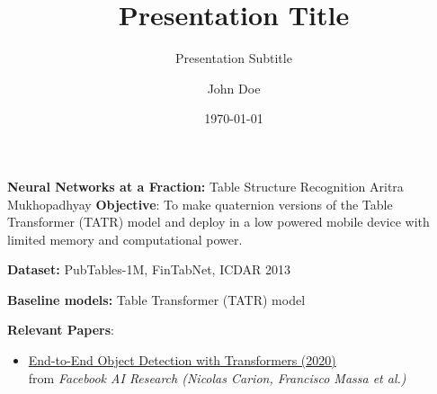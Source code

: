 \documentclass[
11pt,notheorems,hyperref={pdfauthor=Aritra Mukhopadhyay}
]{beamer}
\title[
Project proposal
]{Presentation Title}
\subtitle{Presentation Subtitle}
\author[
Aritra Mukhopadhyay
]{
    John Doe 
}
\institute{
    Author Affiliation, \\
    University of Author}
\date{\today}
\begin{document}
{
}
\addtocounter{framenumber}{-1}



\begin{frame}{\textbf{Neural Networks at a Fraction:} Table Structure Recognition
}{Aritra Mukhopadhyay}
\alert{\textbf{Objective}}: To make quaternion versions of the Table Transformer (TATR) model and deploy in a low powered mobile device with limited memory and computational power.

\alert{\textbf{Dataset:}} PubTables-1M, FinTabNet, ICDAR 2013

\alert{\textbf{Baseline models:}} Table Transformer (TATR) model






\alert{\textbf{Relevant Papers}}:
\begin{itemize}
    \item \href{https://scontent-ccu1-1.xx.fbcdn.net/v/t39.2365-6/154305880_816694605586461_2873294970659239190_n.pdf?_nc_cat=108&ccb=1-7&_nc_sid=3c67a6&_nc_ohc=DkHwrRBBc_cAX-eMpS7&_nc_ht=scontent-ccu1-1.xx&oh=00_AfCVQywPZJ9qTTMxk3f6OzsXUEBE9ASe4JMTKI1zE1gCqQ&oe=64F07EC3}{End-to-End Object Detection with Transformers (2020)}\\
    from \textit{Facebook AI Research (Nicolas Carion, Francisco Massa et al.)}


\end{itemize}
\end{frame}
\end{document}
